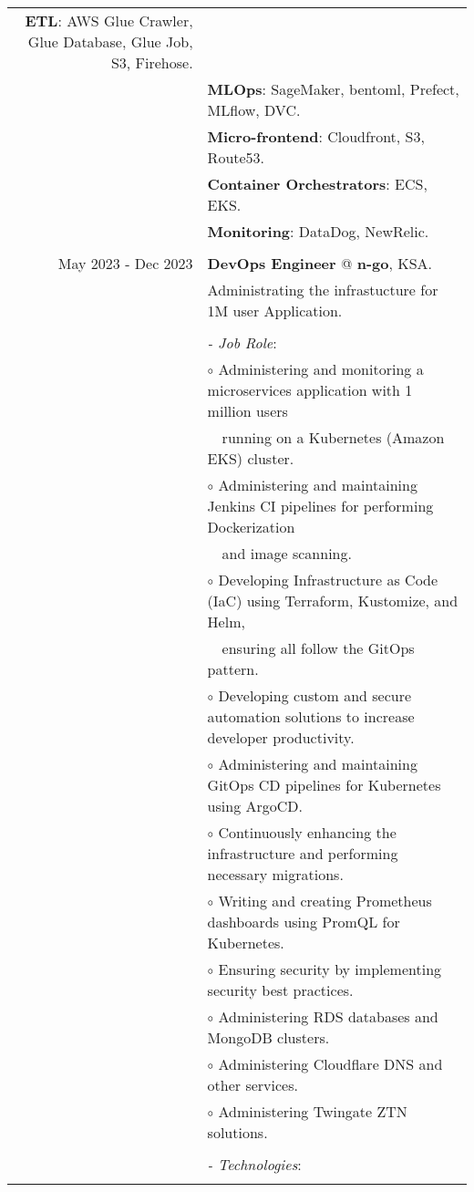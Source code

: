 \documentclass[a4paper,10pt]{article}
\begin{document}
\begin{longtable}{r|l}
    \textbf{ETL}: AWS Glue Crawler, Glue Database, Glue Job, S3, Firehose. \\&
    \textbf{MLOps}: SageMaker, bentoml, Prefect, MLflow, DVC. \\&
    \textbf{Micro-frontend}: Cloudfront, S3, Route53. \\&
    \textbf{Container Orchestrators}: ECS, EKS. \\&
    \textbf{Monitoring}: DataDog, NewRelic. \\&
    \\
    May 2023 - Dec 2023 & \textbf{DevOps Engineer} @
    \textbf{n-go}, KSA. \\&
    Administrating the infrastucture for 1M user Application. \\&
    \\&
    \textit{- Job Role}:\\&
    $\circ$ Administering and monitoring a microservices application with 1 million users \\& 
    ~~running on a Kubernetes (Amazon EKS) cluster. \\&
    $\circ$ Administering and maintaining Jenkins CI pipelines for performing Dockerization \\&
    ~~and image scanning. \\&
    $\circ$ Developing Infrastructure as Code (IaC) using Terraform, Kustomize, and Helm, \\& 
    ~~ensuring all follow the GitOps pattern. \\&
    $\circ$ Developing custom and secure automation solutions to increase developer productivity. \\&
    $\circ$ Administering and maintaining GitOps CD pipelines for Kubernetes using ArgoCD. \\&
    $\circ$ Continuously enhancing the infrastructure and performing necessary migrations. \\&
    $\circ$ Writing and creating Prometheus dashboards using PromQL for Kubernetes. \\&
    $\circ$ Ensuring security by implementing security best practices. \\&
    $\circ$ Administering RDS databases and MongoDB clusters. \\&
    $\circ$ Administering Cloudflare DNS and other services. \\&
    $\circ$ Administering Twingate ZTN solutions. \\&
    \\&
    \textit{- Technologies}:\\&

\end{longtable}
\end{document}
